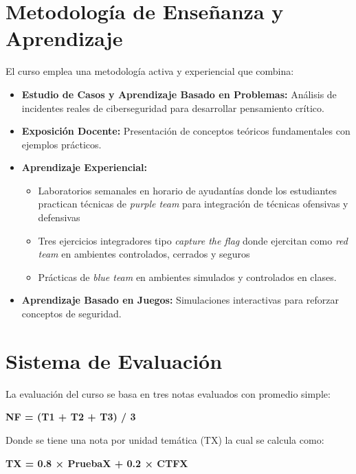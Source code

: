 \documentclass[12pt,a4paper]{article}
\begin{document}
\section*{Metodología de Enseñanza y Aprendizaje}

El curso emplea una metodología activa y experiencial que combina:

\begin{itemize}
\item \textbf{Estudio de Casos y Aprendizaje Basado en Problemas:} Análisis de incidentes reales de ciberseguridad para desarrollar pensamiento crítico.

\item \textbf{Exposición Docente:} Presentación de conceptos teóricos fundamentales con ejemplos prácticos.

\item \textbf{Aprendizaje Experiencial:} 
\begin{itemize}
\item Laboratorios semanales en horario de ayudantías donde los estudiantes practican técnicas de \textit{purple team} para integración de técnicas ofensivas y defensivas 
\item Tres ejercicios integradores tipo \textit{capture the flag} donde ejercitan como \textit{red team} en ambientes controlados, cerrados y seguros
\item Prácticas de \textit{blue team} en ambientes simulados y controlados en clases.
\end{itemize}

\item \textbf{Aprendizaje Basado en Juegos:} Simulaciones interactivas para reforzar conceptos de seguridad.
\end{itemize}

\section*{Sistema de Evaluación}

La evaluación del curso se basa en tres notas evaluados con promedio simple:

\begin{center}
\textbf{NF = (T1 + T2 + T3) / 3}
\end{center}

Donde se tiene una nota por unidad temática (TX) la cual se calcula como:
\begin{center}
\textbf{TX = 0.8 × PruebaX + 0.2 × CTFX}
\end{center}
\end{document}
